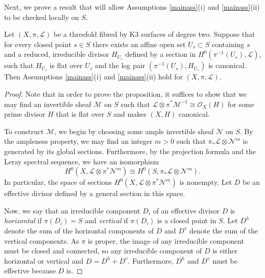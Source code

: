 \documentclass{amsart}
\begin{document}
Next, we prove a result that will allow Assumptions \ref{mainass}(i) and \ref{mainass}(ii) to be checked locally on $S$.

\begin{prop} \label{Lflat} Let $(X,\pi,{\mathcal{L}})$ be a threefold fibred by K3 surfaces of degree two. Suppose that for every closed point $s \in S$ there exists an affine open set $U_s \subset S$ containing $s$ and a reduced, irreducible divisor $H_{U_s}$ defined by a section in $H^0(\pi^{-1}(U_s),{\mathcal{L}})$, such that $H_{U_s}$ is flat over $U_s$ and the log pair $(\pi^{-1}(U_s), H_{U_s})$ is canonical. Then Assumptions \ref{mainass}\textup{(}i\textup{)} and \ref{mainass}\textup{(}ii\textup{)} hold for $(X,\pi,{\mathcal{L}})$. \end{prop}

\begin{proof} Note that in order to prove the proposition, it suffices to show that we may find an invertible sheaf ${\mathcal{M}}$ on $S$ such that ${\mathcal{L}} \otimes \pi^*{\mathcal{M}}^{-1} \cong {\mathcal{O}}_{X}({H})$ for some prime divisor ${H}$ that is flat over $S$ and makes $(X,H)$ canonical.

To construct ${\mathcal{M}}$, we begin by choosing some ample invertible sheaf ${\mathcal{N}}$ on $S$. By the ampleness property, we may find an integer $m > 0$ such that $\pi_*{\mathcal{L}} \otimes {\mathcal{N}}^m$ is generated by its global sections. Furthermore, by the projection formula and the Leray spectral sequence, we have an isomorphism
\begin{equation} H^0(X, {\mathcal{L}} \otimes {\pi}^*{\mathcal{N}}^m) \cong H^0(S, {\pi}_*{\mathcal{L}} \otimes {\mathcal{N}}^m). \label{H0iso} \end{equation}
In particular, the space of sections $H^0(X, {\mathcal{L}} \otimes {\pi}^*{\mathcal{N}}^m)$ is nonempty. Let $D$ be an effective divisor defined by a general section in this space.

Now, we say that an irreducible component $D_i$ of an effective divisor $D$ is \emph{horizontal} if ${\pi}(D_i) = S$ and \emph{vertical} if ${\pi}(D_i)$ is a closed point in $S$. Let $D^h$ denote the sum of the horizontal components of $D$ and $D^v$ denote the sum of the vertical components. As ${\pi}$ is proper, the image of any irreducible component must be closed and connected, so any irreducible component of $D$ is either horizontal or vertical and $D = D^h + D^v$. Furthermore, $D^h$ and $D^v$ must be effective because $D$ is. 


\end{proof}
\end{document}
